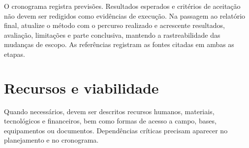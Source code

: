 O cronograma registra previsões. Resultados esperados e critérios de aceitação não devem ser redigidos como evidências de execução. Na passagem ao relatório final, atualize o método com o percurso realizado e acrescente resultados, avaliação, limitações e parte conclusiva, mantendo a rastreabilidade das mudanças de escopo. As referências registram as fontes citadas em ambas as etapas.

\section{Recursos e viabilidade}

Quando necessários, devem ser descritos recursos humanos, materiais, tecnológicos e financeiros, bem como formas de acesso a campo, bases, equipamentos ou documentos. Dependências críticas precisam aparecer no planejamento e no cronograma.

